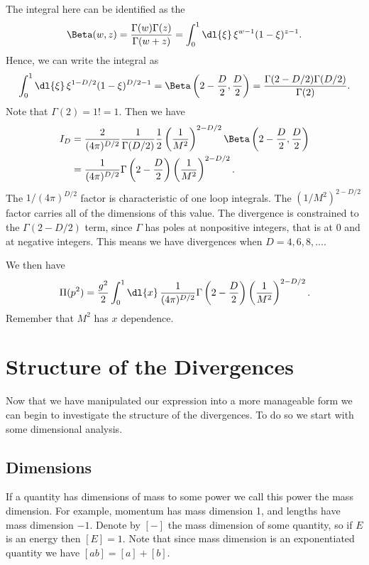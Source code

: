 \documentclass[fleqn]{NotesClass}
\begin{document}
    The integral here can be identified as the 
    \begin{equation}
        \Beta(w, z) = \frac{\Gamma(w)\Gamma(z)}{\Gamma(w + z)} = \int_0^{1} \dl{\xi} \, \xi^{w - 1} (1 - \xi)^{z - 1}.
    \end{equation}
    Hence, we can write the integral as
    \begin{equation}
        \int_0^1 \dl{\xi} \, \xi^{1 - D/2}(1 - \xi)^{D/2 - 1} = \Beta\left( 2 - \frac{D}{2}, \frac{D}{2} \right) = \frac{\Gamma(2 - D/2)\Gamma(D/2)}{\Gamma(2)}.
    \end{equation}
    Note that \(\Gamma(2) = 1! = 1\).
    Then we have
    \begin{align}
        I_D &= \frac{2}{(4\pi)^{D/2}} \frac{1}{\Gamma(D/2)} \frac{1}{2} \left( \frac{1}{M^2} \right)^{2-D/2} \Beta\left( 2 - \frac{D}{2}, \frac{D}{2} \right)\\
        &= \frac{1}{(4\pi)^{D/2}} \Gamma\left( 2 - \frac{D}{2} \right) \left( \frac{1}{M^2} \right)^{2 - D/2}.
    \end{align}
    The \(1/(4\pi)^{D/2}\) factor is characteristic of one loop integrals.
    The \((1/M^2)^{2 - D/2}\) factor carries all of the dimensions of this value.
    The divergence is constrained to the \(\Gamma(2 - D/2)\) term, since \(\Gamma\) has poles at nonpositive integers, that is at 0 and at negative integers.
    This means we have divergences when \(D = 4, 6, 8, \dotsc\).
    
    We then have
    \begin{equation}
        \Pi(p^2) = \frac{g^2}{2} \int_0^1 \dl{x} \, \frac{1}{(4\pi)^{D/2}} \Gamma\left( 2 - \frac{D}{2} \right) \left( \frac{1}{M^2} \right)^{2 - D/2}.
    \end{equation}
    Remember that \(M^2\) has \(x\) dependence.
    
    \chapter{Structure of the Divergences}
    Now that we have manipulated our expression into a more manageable form we can begin to investigate the structure of the divergences.
    To do so we start with some dimensional analysis.
    
    \section{Dimensions}
    If a quantity has dimensions of mass to some power we call this power the mass dimension.
    For example, momentum has mass dimension 1, and lengths have mass dimension \(-1\).
    Denote by \([-]\) the mass dimension of some quantity, so if \(E\) is an energy then \([E] = 1\).
    Note that since mass dimension is an exponentiated quantity we have \([ab] = [a] + [b]\).
    
\end{document}
